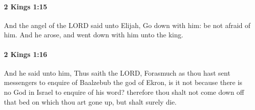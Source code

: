 		\paragraph{2 Kings 1:15} %
			\label{2KINGS-1-15}

			And the angel of the LORD said unto Elijah, Go down with him: be not afraid of him. And he arose, and went down with him unto the king.


		\paragraph{2 Kings 1:16} %
			\label{2KINGS-1-16}

			And he said unto him, Thus saith the LORD, Forasmuch as thou hast sent messengers to enquire of Baalzebub the god of Ekron, is it not because there is no God in Israel to enquire of his word? therefore thou shalt not come down off that bed on which thou art gone up, but shalt surely die.

